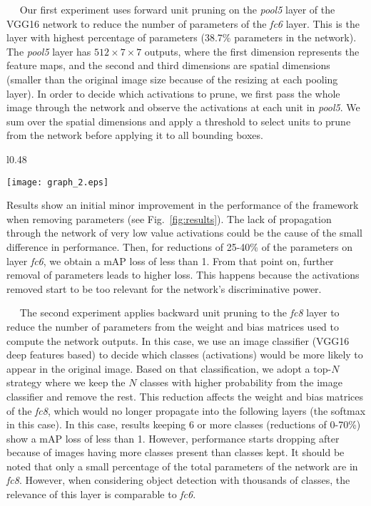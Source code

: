 \documentclass{article}
\newcommand{\minisection}[1]{\vspace{0.04in} \noindent {\bf #1}\ \ }
\begin{document}
\minisection{Forward pruning.} Our first experiment uses forward unit
pruning on the \textit{pool5} layer of the VGG16 network to reduce the
number of parameters of the \textit{fc6} layer. This is the layer with
highest percentage of parameters (38.7\% parameters in the
network). The \textit{pool5} layer has $512\times 7\times 7$ outputs,
where the first dimension represents the feature maps, and the second
and third dimensions are spatial dimensions (smaller than the original
image size because of the resizing at each pooling layer). In order to
decide which activations to prune, we first pass the whole image
through the network and observe the activations at each unit in
\textit{pool5}. We sum over the spatial dimensions and apply a
threshold to select units to prune from the network before applying it
to all bounding boxes.
\begin{wrapfigure}{l}{0.48\textwidth}
  \begin{center}
    \texttt{[image: graph\_2.eps]}
  \end{center}
  \caption{Performance loss as a function of parameter reduction.}\label{fig:results}
\end{wrapfigure}
Results show an initial minor improvement in the performance of the
framework when removing parameters (see Fig.~\ref{fig:results}). The
lack of propagation through the network of very low value activations
could be the cause of the small difference in performance. Then, for
reductions of 25-40\% of the parameters on layer \textit{fc6}, we
obtain a mAP loss of less than 1. From that point on, further removal
of parameters leads to higher loss. This happens because the
activations removed start to be too relevant for the network's
discriminative
power.

\minisection{Backward pruning.} The second experiment applies backward
unit pruning to the \textit{fc8} layer to reduce the number of
parameters from the weight and bias matrices used to compute the
network outputs. In this case, we use an image classifier (VGG16 deep
features based) to decide which classes (activations) would be more
likely to appear in the original image. Based on that classification,
we adopt a top-$N$ strategy where we keep the $N$ classes with higher
probability from the image classifier and remove the rest. This
reduction affects the weight and bias matrices of the \textit{fc8},
which would no longer propagate into the following layers (the softmax
in this case).  In this case, results keeping 6 or more classes
(reductions of 0-70\%) show a mAP loss of less than 1. However,
performance starts dropping after because of images having more
classes present than classes kept. It should be noted that only a
small percentage of the total parameters of the network are in
\textit{fc8}. However, when considering object detection with
thousands of classes, the relevance of this layer is comparable to
\textit{fc6}.
\end{document}
